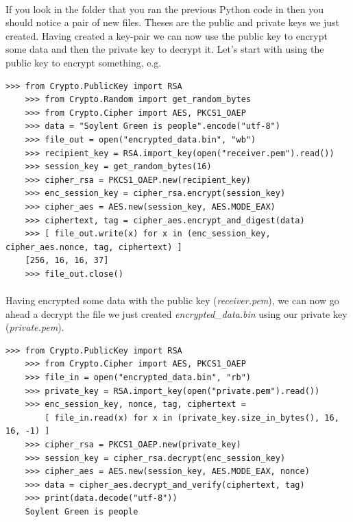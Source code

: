\documentclass[12pt, a4paper, oneside]{book}
\begin{document}
{\paragraph{} If you look in the folder that you ran the previous Python code in then you should notice a pair of new files. Theses are the public and private keys we just created. Having created a key-pair we can now use the public key to encrypt some data and then the private key to decrypt it. Let's start with using the public key to encrypt something, e.g.

\begin{lstlisting}[style=DOS]
    >>> from Crypto.PublicKey import RSA
    >>> from Crypto.Random import get_random_bytes
    >>> from Crypto.Cipher import AES, PKCS1_OAEP
    >>> data = "Soylent Green is people".encode("utf-8")
    >>> file_out = open("encrypted_data.bin", "wb")
    >>> recipient_key = RSA.import_key(open("receiver.pem").read())
    >>> session_key = get_random_bytes(16)
    >>> cipher_rsa = PKCS1_OAEP.new(recipient_key)
    >>> enc_session_key = cipher_rsa.encrypt(session_key)
    >>> cipher_aes = AES.new(session_key, AES.MODE_EAX)
    >>> ciphertext, tag = cipher_aes.encrypt_and_digest(data)
    >>> [ file_out.write(x) for x in (enc_session_key, cipher_aes.nonce, tag, ciphertext) ]
    [256, 16, 16, 37]
    >>> file_out.close()
\end{lstlisting}

\paragraph{} Having encrypted some data with the public key (\emph{receiver.pem}), we can now go ahead a decrypt the file we just created \emph{encrypted\_data.bin} using our private key (\emph{private.pem}).

\begin{lstlisting}[style=DOS]
    >>> from Crypto.PublicKey import RSA
    >>> from Crypto.Cipher import AES, PKCS1_OAEP
    >>> file_in = open("encrypted_data.bin", "rb")
    >>> private_key = RSA.import_key(open("private.pem").read())
    >>> enc_session_key, nonce, tag, ciphertext = 
        [ file_in.read(x) for x in (private_key.size_in_bytes(), 16, 16, -1) ]
    >>> cipher_rsa = PKCS1_OAEP.new(private_key)
    >>> session_key = cipher_rsa.decrypt(enc_session_key)
    >>> cipher_aes = AES.new(session_key, AES.MODE_EAX, nonce)
    >>> data = cipher_aes.decrypt_and_verify(ciphertext, tag)
    >>> print(data.decode("utf-8"))
    Soylent Green is people
\end{lstlisting}

}
\end{document}
